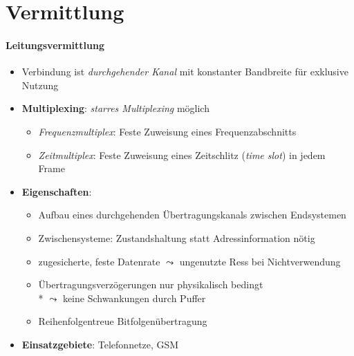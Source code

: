 \section{Vermittlung}

\paragraph{Leitungsvermittlung}
\begin{itemize}
  \item Verbindung ist \emph{durchgehender Kanal} mit konstanter Bandbreite für exklusive Nutzung
  \item \textbf{Multiplexing}: \emph{starres Multiplexing} möglich
  \begin{itemize}
    \item \emph{Frequenzmultiplex}: Feste Zuweisung eines Frequenzabschnitts
    \item \emph{Zeitmultiplex}: Feste Zuweisung eines Zeitschlitz (\emph{time slot}) in jedem Frame
  \end{itemize}
  \item \textbf{Eigenschaften}:
  \begin{itemize}
    \item Aufbau eines durchgehenden Übertragungskanals zwischen Endsystemen
    \item Zwischensysteme: Zustandshaltung statt Adressinformation nötig
    \item zugesicherte, feste Datenrate \( \leadsto \) ungenutzte Ress bei Nichtverwendung
    \item Übertragungsverzögerungen nur physikalisch bedingt \\* \( \leadsto \) keine Schwankungen durch Puffer
    \item Reihenfolgentreue Bitfolgenübertragung
  \end{itemize}
  \item \textbf{Einsatzgebiete}: Telefonnetze, GSM
\end{itemize}

